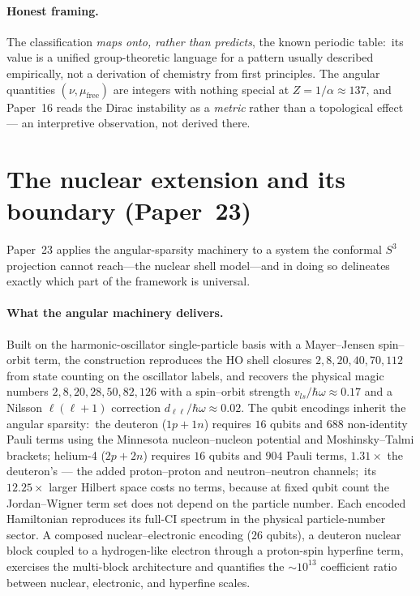 \documentclass[aps,pra,twocolumn,superscriptaddress,longbibliography]{revtex4-2}
\newcommand{\gvq}[2]{#2}
\begin{document}
\paragraph{Honest framing.}
The classification \emph{maps onto, rather than predicts}, the known
periodic table:\ its value is a unified group-theoretic language for a
pattern usually described empirically, not a derivation of chemistry
from first principles.  The angular quantities $(\nu,
\mu_{\mathrm{free}})$ are integers with nothing special at
$Z = 1/\alpha \approx 137$, and Paper~16 reads the Dirac instability as a
\emph{metric} rather than a topological effect --- an interpretive
observation, not derived there.

\section{The nuclear extension and its boundary (Paper~23)}

Paper~23 applies the angular-sparsity machinery to a system the
conformal $S^3$ projection cannot reach---the nuclear shell model---and
in doing so delineates exactly which part of the framework is universal.

\paragraph{What the angular machinery delivers.}
Built on the harmonic-oscillator single-particle basis with a
Mayer--Jensen spin--orbit term, the construction reproduces the HO shell
closures $2, 8, 20, 40, 70, 112$ from state counting on the oscillator labels, and
recovers the physical magic numbers $2, 8, 20, 28, 50, 82, 126$ with a
spin--orbit strength $v_{ls}/\hbar\omega \approx 0.17$ and a Nilsson
$\ell(\ell+1)$ correction $d_{\ell\ell}/\hbar\omega \approx 0.02$.  The
qubit encodings inherit the angular sparsity:\ the deuteron ($1p+1n$)
requires $16$ qubits and $688$ non-identity Pauli terms using the
Minnesota nucleon--nucleon potential and
Moshinsky--Talmi brackets; helium-4 ($2p+2n$) requires $16$ qubits and
$\gvq{p23_he4_pauli}{904}$ Pauli terms, $\gvq{p23_he4_deuteron_pauli_ratio}{1.31}\times$ the deuteron's --- the added
proton--proton and neutron--neutron channels;\ its $12.25\times$ larger
Hilbert space costs no terms, because at fixed qubit count the
Jordan--Wigner term set does not depend on the particle number.  Each
encoded Hamiltonian reproduces its full-CI spectrum in the physical
particle-number sector.  A composed nuclear--electronic encoding
($26$ qubits), a deuteron nuclear block coupled to a hydrogen-like
electron through a proton-spin hyperfine term, exercises the
multi-block architecture and quantifies the $\sim 10^{13}$ coefficient
ratio between nuclear, electronic, and hyperfine scales.
\end{document}
